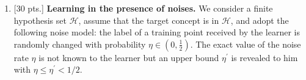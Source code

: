 \documentclass[12pt,letterpaper]{article}
\newenvironment{solution}{%
  \begin{proof}[Solution]$ $\par\nobreak\ignorespaces
}{%
  \end{proof}
}
\def \H{\mathcal H}
\def \E{\mathcal E}
\def \hint{\textbf{Hint: }}
\begin{document}
\begin{enumerate}
\begin{solution}
\begin{enumerate}[label=(\alph*)]
$$\begin{aligned}
\end{aligned}
$$
\item Repeat what's written on lecture notes word by word, and we see that 
$$
\begin{aligned}
&(\frac{Vol(\E_{t+1})}{Vol(\E_t)})^2\\
&=\frac{\operatorname{det}\left(A_{t+1}\right)}{\operatorname{det}\left(A_{t}\right)}=\left(1+\frac{1}{d^2})^d(\frac{d^{2}}{d^{2}-1}\right)^{d}\left(1-\frac{2}{d+1}\right) \\
&=(1+\frac{1}{2d^2})^d\left(1+\frac{1}{d^{2}-1}\right)^{d-1}\left(\frac{d-1}{d+1} \cdot \frac{d^{2}}{d^{2}-1}\right)
=(1+\frac{1}{2d^2})^d\left(1+\frac{1}{d^{2}-1}\right)^{d-1}\left(1-\frac{1}{d+1}\right)^{2} \\
&\leq \exp(\frac{d}{2d^2})\exp \left(\frac{d-1}{d^{2}-1}\right) \cdot \exp \left(-\frac{2}{d+1}\right)\leq\exp \left(-\frac{1}{2(d+1)}\right)
\end{aligned}
$$
The lower bound of the volume remains unchanged, so the mistake bound is doubled: $d(4d+4)\log(2n)$ mistakes. 
\end{enumerate}
\end{solution}




\item {[30 pts.]}
{\bf Learning in the presence of noises.}  We consider a
finite hypothesis set $\H$, assume that the target concept is in $\H$, and adopt the
following noise model: the label of a training point received by the learner is randomly changed with probability $\eta \in\left(0, \frac{1}{2}\right)$. The exact value of the noise rate $\eta$ is not known to the learner but an upper bound $\eta^{\prime}$ is revealed to him with $\eta \leq \eta^{\prime}<1 / 2$.
\begin{enumerate}[label=(\alph*)]


\end{enumerate}
\end{enumerate}
\end{document}

